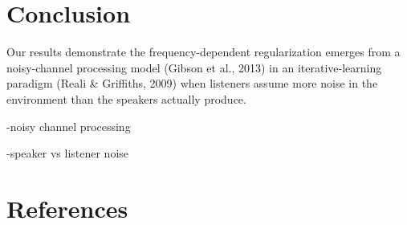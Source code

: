 \documentclass[
  jou,floatsintext]{apa6}
\begin{document}
\section{Conclusion}\label{conclusion}

Our results demonstrate the frequency-dependent regularization emerges from a noisy-channel processing model (Gibson et al., 2013) in an iterative-learning paradigm (Reali \& Griffiths, 2009) when listeners assume more noise in the environment than the speakers actually produce.

-noisy channel processing

-speaker vs listener noise

\newpage

\section{References}\label{references}
\end{document}
